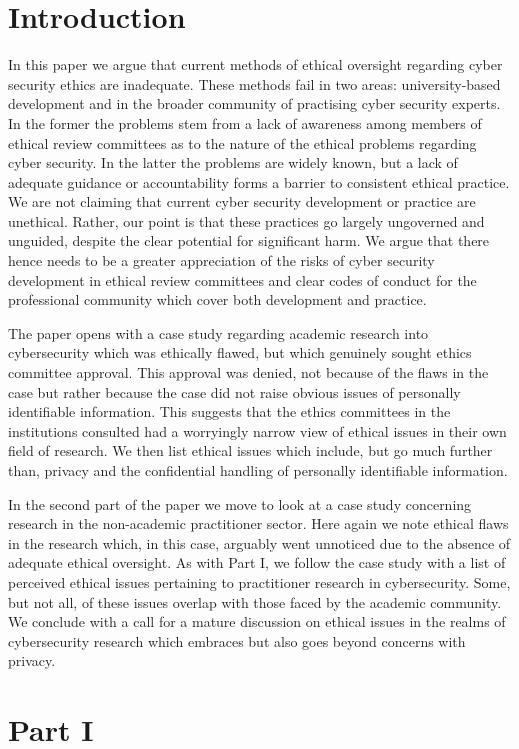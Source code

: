 \documentclass{svjour3}                     %
\begin{document}
\section{Introduction}
\label{intro}
In this paper we argue that current methods of ethical oversight regarding cyber security ethics are inadequate. These methods fail in two areas: university-based development and in the broader community of practising cyber security experts. In the former the problems stem from a lack of awareness among members of ethical review committees as to the nature of the ethical problems regarding cyber security. In the latter the problems are widely known, but a lack of adequate guidance or accountability forms a barrier to consistent ethical practice. We are not claiming that current cyber security development or practice are unethical. Rather, our point is that these practices go largely ungoverned and unguided, despite the clear potential for significant harm. We argue that there hence needs to be a greater appreciation of the risks of cyber security development in ethical review committees and clear codes of conduct for the professional community which cover both development and practice.

The paper opens with a case study regarding academic research into cybersecurity which was ethically flawed, but which genuinely sought ethics committee approval. This approval was denied, not because of the flaws in the case but rather because the case did not raise obvious issues of personally identifiable information. This suggests that the ethics committees in the institutions consulted had a worryingly narrow view of ethical issues in their own field of research. We then list ethical issues which include, but go much further than, privacy and the confidential handling of personally identifiable information.

In the second part of the paper we move to look at a case study concerning research in the non-academic practitioner sector. Here again we note ethical flaws in the research which, in this case, arguably went unnoticed due to the absence of adequate ethical oversight. As with Part I, we follow the case study with a list of perceived ethical issues pertaining to practitioner research in cybersecurity. Some, but not all, of these issues overlap with those faced by the academic community. We conclude with a call for a mature discussion on ethical issues in the realms of cybersecurity research which embraces but also goes beyond concerns with privacy.


\section{Part I}
\end{document}
